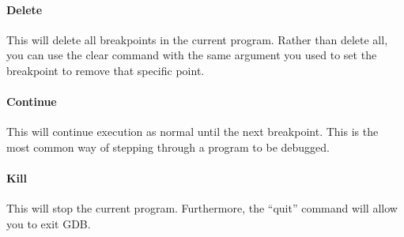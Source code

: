 		\paragraph{Delete}
		This will delete all breakpoints in the current program.
		Rather than delete all,
		you can use the clear command with the same argument you used to set the breakpoint to remove that specific point.

		\paragraph{Continue}
		This will continue execution as normal until the next breakpoint.
		This is the most common way of stepping through a program to be debugged.

		\paragraph{Kill}
		This will stop the current program.
		Furthermore, the ``quit'' command will allow you to exit GDB.

